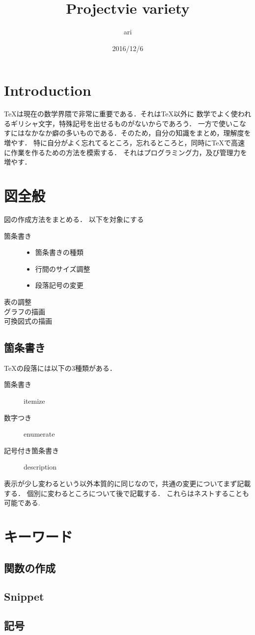\documentclass{ujarticle}
\author{ari}
\title{Projectvie variety}
\date{2016/12/6}
\begin{document}
\section{Introduction}
\label{sec:Introduction}
TeXは現在の数学界隈で非常に重要である．それはTeX以外に
数学でよく使われるギリシャ文字，特殊記号を出せるものがないからであろう．
一方で使いこなすにはなかなか癖の多いものである．そのため，自分の知識をまとめ，理解度を増やす．
特に自分がよく忘れてるところ，忘れるところと，同時にTeXで高速に作業を作るための方法を模索する．
それはプログラミング力，及び管理力を増やす．


\section{図全般}
\label{sec:図全般}
図の作成方法をまとめる．
以下を対象にする
\begin{description}
  \item[箇条書き]
  \begin{itemize}
    \item 箇条書きの種類
    \item 行間のサイズ調整
    \item 段落記号の変更
  \end{itemize}
  \item[表の調整]
  \item[グラフの描画]
  \item[可換図式の描画]
\end{description}

\subsection{箇条書き}
\label{sub:箇条書き}
TeXの段落には以下の3種類がある．
\begin{description}
  \item[箇条書き] itemize
  \item[数字つき] enumerate
  \item[記号付き箇条書き] description
\end{description}

表示が少し変わるという以外本質的に同じなので，共通の変更についてまず記載する．
個別に変わるところについて後で記載する．
これらはネストすることも可能である.



\section{キーワード}
\label{sec:キーワード}

\subsection{関数の作成}
\label{sub:関数の作成}

\subsection{Snippet}
\label{sub:Snippet}

\subsection{記号}
\label{sub:記号}
\end{document}
